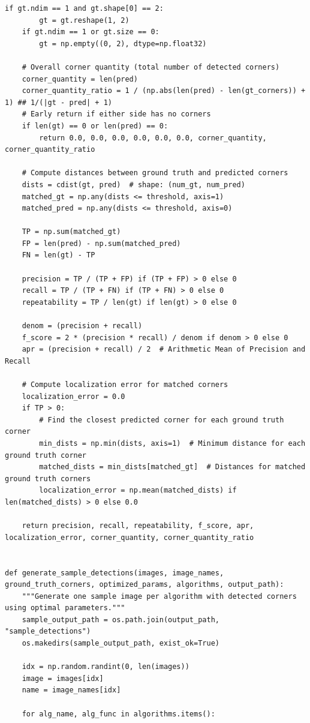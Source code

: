 \documentclass[journal]{IEEEtran}
\begin{document}
\begin{lstlisting}[style=python, caption={Utility Functions for Data Processing}, label={lst:utilities}]
    if gt.ndim == 1 and gt.shape[0] == 2:
        gt = gt.reshape(1, 2)
    if gt.ndim == 1 or gt.size == 0:
        gt = np.empty((0, 2), dtype=np.float32)

    # Overall corner quantity (total number of detected corners)
    corner_quantity = len(pred)
    corner_quantity_ratio = 1 / (np.abs(len(pred) - len(gt_corners)) + 1) ## 1/(|gt - pred| + 1)
    # Early return if either side has no corners
    if len(gt) == 0 or len(pred) == 0:
        return 0.0, 0.0, 0.0, 0.0, 0.0, 0.0, corner_quantity, corner_quantity_ratio

    # Compute distances between ground truth and predicted corners
    dists = cdist(gt, pred)  # shape: (num_gt, num_pred)
    matched_gt = np.any(dists <= threshold, axis=1)
    matched_pred = np.any(dists <= threshold, axis=0)

    TP = np.sum(matched_gt)
    FP = len(pred) - np.sum(matched_pred)
    FN = len(gt) - TP

    precision = TP / (TP + FP) if (TP + FP) > 0 else 0
    recall = TP / (TP + FN) if (TP + FN) > 0 else 0
    repeatability = TP / len(gt) if len(gt) > 0 else 0

    denom = (precision + recall)
    f_score = 2 * (precision * recall) / denom if denom > 0 else 0
    apr = (precision + recall) / 2  # Arithmetic Mean of Precision and Recall

    # Compute localization error for matched corners
    localization_error = 0.0
    if TP > 0:
        # Find the closest predicted corner for each ground truth corner
        min_dists = np.min(dists, axis=1)  # Minimum distance for each ground truth corner
        matched_dists = min_dists[matched_gt]  # Distances for matched ground truth corners
        localization_error = np.mean(matched_dists) if len(matched_dists) > 0 else 0.0

    return precision, recall, repeatability, f_score, apr, localization_error, corner_quantity, corner_quantity_ratio


def generate_sample_detections(images, image_names, ground_truth_corners, optimized_params, algorithms, output_path):
    """Generate one sample image per algorithm with detected corners using optimal parameters."""
    sample_output_path = os.path.join(output_path, "sample_detections")
    os.makedirs(sample_output_path, exist_ok=True)
    
    idx = np.random.randint(0, len(images))
    image = images[idx]
    name = image_names[idx]
    
    for alg_name, alg_func in algorithms.items():


\end{lstlisting}
\end{document}
